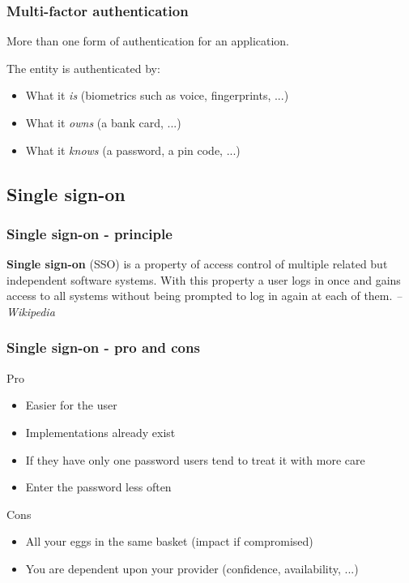 \begin{frame}
\frametitle{Multi-factor authentication}
\begin{center}
More than one form of authentication for an application.
\end{center}
The entity is authenticated by:
\begin{itemize}
\item What it \emph{is} (biometrics such as voice, fingerprints, ...)
\item What it \emph{owns} (a bank card, ...)
\item What it \emph{knows} (a password, a pin code, ...)
\end{itemize}
\end{frame}

\subsection{Single sign-on}

\begin{frame}
\frametitle{Single sign-on - principle}
\textbf{Single sign-on} (SSO) is a property of access control of multiple
related but independent software systems. With this property a user
logs in once and gains access to all systems without being prompted to
log in again at each of them.
\textit{-- Wikipedia}
\end{frame}

\begin{frame}
\frametitle{Single sign-on - pro and cons}
\begin{block}{Pro}
\begin{itemize}
\item Easier for the user
\item Implementations already exist
\item If they have only one password users tend to treat it with more care
\item Enter the password less often
\end{itemize}
\end{block}
\begin{block}{Cons}
\begin{itemize}
\item All your eggs in the same basket (impact if compromised)
\item You are dependent upon your provider (confidence, availability, ...)
\end{itemize}
\end{block}
\end{frame}


